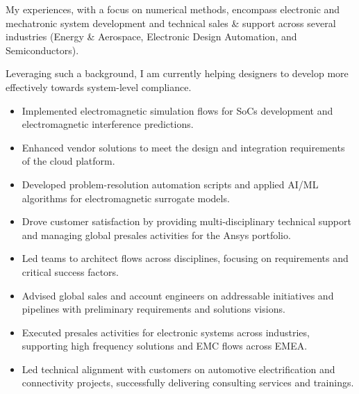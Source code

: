 \documentclass[9pt,a4paper,ragged2e,withhyper]{altacv} %
\begin{document}
\begin{paracol}{2}
My experiences, with a focus on numerical methods, encompass electronic and
mechatronic system development and technical sales \& support across several
industries (Energy \& Aerospace, Electronic Design Automation, and Semiconductors).

\medskip

Leveraging such a background, I am currently helping designers to develop more
effectively towards system-level compliance.


\begin{itemize}
\item Implemented electromagnetic simulation flows for SoCs development and electromagnetic interference
predictions.
\item Enhanced vendor solutions to meet the design and integration requirements of the cloud platform.
\item Developed problem-resolution automation scripts and applied AI/ML algorithms for
electromagnetic surrogate models.
\end{itemize}
\divider

\begin{itemize}
\item Drove customer satisfaction by providing multi-disciplinary technical support and
managing global presales activities for the Ansys portfolio.
\item Led teams to architect flows across disciplines, focusing on requirements and
critical success factors.
\item Advised global sales and account engineers on addressable initiatives and pipelines
with preliminary requirements and solutions visions.
\end{itemize}
\divider

\begin{itemize}
\item Executed presales activities for electronic systems across industries, supporting
high frequency solutions and EMC flows across EMEA.
\item Led technical alignment with customers on automotive electrification and
connectivity projects, successfully delivering consulting services and trainings.
\end{itemize}
\divider


\end{paracol}
\end{document}
